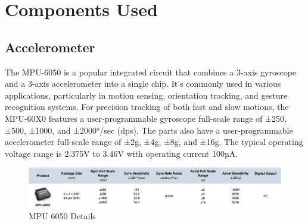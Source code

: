 \newpage
\section{Components Used}

\subsection{Accelerometer}
The MPU-6050 is a popular integrated circuit that combines a 3-axis gyroscope and a 3-axis accelerometer into a single chip. It's commonly used in various applications, particularly in motion sensing, orientation tracking, and gesture recognition systems.
For precision tracking of both fast and slow motions, the MPU-60X0 features a user-programmable gyroscope full-scale range of ±250, ±500, ±1000, and ±2000°/sec (dps). The parts also have a user-programmable accelerometer full-scale range of ±2g, ±4g, ±8g, and ±16g. The typical operating voltage range is 2.375V to 3.46V with operating current 100µA.
\begin{figure}[H]
    \centering
    \includegraphics[width=1\linewidth]{Files/Images/Accelerometer.jpg}
    \caption{MPU 6050 Details}
    \label{fig:enter-label}
\end{figure}

\subsection{}